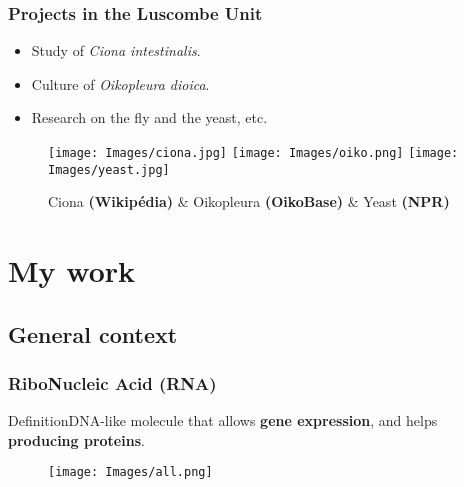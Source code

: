 \documentclass{beamer}
\begin{document}
\begin{frame}
\frametitle{Projects in the Luscombe Unit}

\begin{itemize}[<+>]
\item Study of \textit{Ciona intestinalis}. 
\item Culture of \textit{Oikopleura dioica}. 
\item Research on the fly and the yeast, etc.
\end{itemize}

\begin{figure}
\centering
\subfigure\texttt{[image: Images/ciona.jpg]}
\subfigure\texttt{[image: Images/oiko.png]}
\subfigure\texttt{[image: Images/yeast.jpg]}
\caption{Ciona \textbf{(Wikipédia)} \& Oikopleura \textbf{(OikoBase)} \& Yeast \textbf{(NPR)}}
\end{figure}

\end{frame}

\section{My work}

\begin{frame}
\tableofcontents[currentsection]
\end{frame}

\subsection{General context} 

\begin{frame}
\tableofcontents[currentsubsection]
\end{frame}

\begin{frame}
\frametitle{RiboNucleic Acid (RNA)}

\begin{block}{Definition}DNA-like molecule that allows \textbf{gene expression}, and helps \textbf{producing proteins}.\end{block}

\begin{figure}
\center
\texttt{[image: Images/all.png]}
\end{figure}

\end{frame}
\end{document}

